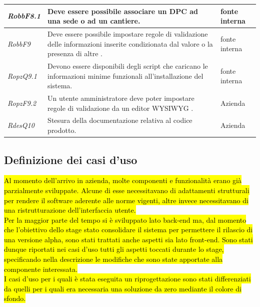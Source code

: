 \begin{flushleft}
\begin{tabular}{|l{2cm}|l{8cm}|l{2cm}|}
		\hline
		\label{RobbF8.1}
		\textit{RobbF8.1} & Deve essere possibile associare un \gls{DPC} ad una sede o ad un cantiere. & fonte interna\\
		\hline
		\label{RobbF9}
		\textit{RobbF9} & Deve essere possibile impostare regole di validazione delle informazioni inserite condizionata dal valore o la presenza di altre . & fonte interna\\
		\hline
		\label{RdesQ9.1}
		\textit{RopzQ9.1} & Devono essere disponibili degli script che caricano le informazioni minime funzionali all'installazione del sistema. & fonte interna\\
		\hline
		\label{RdesF9.2}
		\textit{RopzF9.2} & Un utente amministratore deve poter impostare regole di validazione da un editor \gls{WYSIWYG} . & Azienda \\
		\hline
		\label{RdesQ10}
		\textit{RdesQ10} & Stesura della documentazione relativa al codice prodotto. & Azienda \\
		\hline
	\end{tabular}
\end{flushleft}

\newpage
\subsection{Definizione dei casi d'uso}
	\hl{Al momento dell'arrivo in azienda, molte componenti e funzionalità erano già parzialmente sviluppate. Alcune di esse necessitavano di adattamenti strutturali per rendere il software aderente alle norme vigenti, altre invece necessitavano di una ristrutturazione dell'interfaccia utente. \\ 
	Per la maggior parte del tempo si è sviluppato lato back-end  ma, dal momento che l'obiettivo dello stage  stato consolidare il sistema per permettere il rilascio di una versione alpha, sono stati trattati anche aspetti sia lato front-end. 
	Sono stati dunque riportati nei casi d'uso tutti gli aspetti toccati durante lo stage,  specificando nella descrizione le modifiche che sono state apportate alla componente interessata. \\ 
	I casi  d'uso per i quali è stata eseguita un riprogettazione sono stati differenziati da quelli per i quali era necessaria una soluzione da zero mediante il colore di sfondo.}
